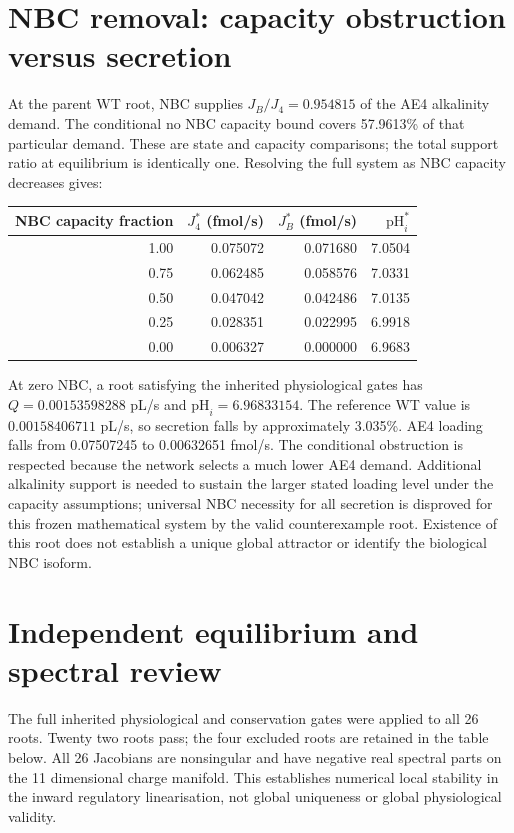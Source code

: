 \section{NBC removal: capacity obstruction versus secretion}
At the parent WT root, NBC supplies $J_B/J_4=0.954815$ of the AE4
alkalinity demand. The conditional no NBC capacity bound covers 57.9613\%
of that particular demand. These are state and capacity comparisons; the
total support ratio at equilibrium is identically one.
Resolving the full system as NBC capacity decreases gives:
\begin{center}

\begin{tabular}{rrrr}
\toprule
NBC capacity fraction & $J_4^*$ (fmol/s) & $J_B^*$ (fmol/s) & $\mathrm{pH}_i^*$ \\
\midrule
1.00 & 0.075072 & 0.071680 & 7.0504 \\
0.75 & 0.062485 & 0.058576 & 7.0331 \\
0.50 & 0.047042 & 0.042486 & 7.0135 \\
0.25 & 0.028351 & 0.022995 & 6.9918 \\
0.00 & 0.006327 & 0.000000 & 6.9683 \\
\bottomrule
\end{tabular}


\end{center}
At zero NBC, a root satisfying the inherited physiological gates has
$Q=0.00153598288$ pL/s and $\mathrm{pH}_i=6.96833154$.
The reference WT value is $0.00158406711$ pL/s, so secretion falls by
approximately 3.035\%. AE4 loading falls from 0.07507245 to
0.00632651 fmol/s. The conditional obstruction is respected because
the network selects a much lower AE4 demand. Additional alkalinity support
is needed to sustain the larger stated loading level under the capacity
assumptions; universal NBC necessity for all secretion is disproved for
this frozen mathematical system by the valid counterexample root.
Existence of this root does not establish a unique global attractor or
identify the biological NBC isoform.


\section{Independent equilibrium and spectral review}

The full inherited physiological and conservation gates were applied to all 26 roots. Twenty two roots pass; the four excluded roots are retained in the table below. All 26 Jacobians are nonsingular and have negative real spectral parts on the 11 dimensional charge manifold. This establishes numerical local stability in the inward regulatory linearisation, not global uniqueness or global physiological validity.

